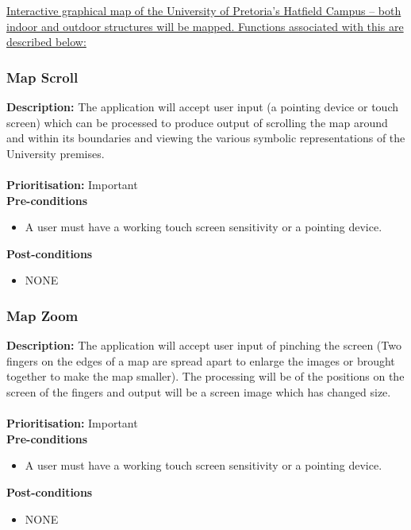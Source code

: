 \documentclass[runningheads,a4paper]{article}
\begin{document}
\noindent \underline{Interactive graphical map of the University of Pretoria's Hatfield Campus – both indoor and outdoor structures will be mapped. Functions associated with this are described below:}

\subsubsection{Map Scroll}

\textbf{Description:}  The application will accept user input (a pointing device or touch screen) which can be processed to produce output of scrolling the map around and within its boundaries and viewing the various symbolic representations of the University premises.\\\\
\noindent
\textbf{Prioritisation:} Important\\
  
  
\textbf{Pre-conditions}
\begin{itemize}
 	\item A user must have a working touch screen sensitivity or a pointing device.
\end{itemize}
  
\textbf{Post-conditions}
\begin{itemize}
  	\item NONE
\end{itemize}

\subsubsection{Map Zoom}

\textbf{Description:}  The application will accept user input of pinching the screen (Two fingers on the edges of a map are spread apart to enlarge the images or brought together to make the map smaller). The processing will be of the positions on the screen of the fingers and output will be a screen image which has changed size.\\\\
\noindent
\textbf{Prioritisation:} Important\\
  
  
\textbf{Pre-conditions}
\begin{itemize}
 	\item A user must have a working touch screen sensitivity or a pointing device.
\end{itemize}
  
\textbf{Post-conditions}
\begin{itemize}
  	\item NONE
\end{itemize}
\end{document}
